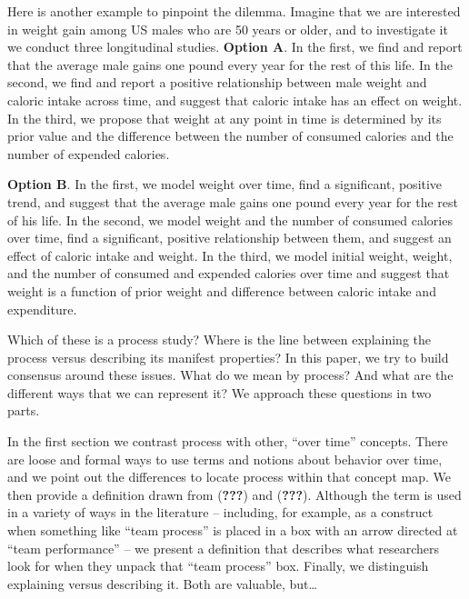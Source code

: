 \documentclass[english,,man]{apa6}
\theoremstyle{definition}
\theoremstyle{definition}
\theoremstyle{definition}
\theoremstyle{remark}
\begin{document}
Here is another example to pinpoint the dilemma. Imagine that we are
interested in weight gain among US males who are 50 years or older, and
to investigate it we conduct three longitudinal studies. \textbf{Option
A}. In the first, we find and report that the average male gains one
pound every year for the rest of this life. In the second, we find and
report a positive relationship between male weight and caloric intake
across time, and suggest that caloric intake has an effect on weight. In
the third, we propose that weight at any point in time is determined by
its prior value and the difference between the number of consumed
calories and the number of expended calories.

\textbf{Option B}. In the first, we model weight over time, find a
significant, positive trend, and suggest that the average male gains one
pound every year for the rest of his life. In the second, we model
weight and the number of consumed calories over time, find a
significant, positive relationship between them, and suggest an effect
of caloric intake and weight. In the third, we model initial weight,
weight, and the number of consumed and expended calories over time and
suggest that weight is a function of prior weight and difference between
caloric intake and expenditure.

Which of these is a process study? Where is the line between explaining
the process versus describing its manifest properties? In this paper, we
try to build consensus around these issues. What do we mean by process?
And what are the different ways that we can represent it? We approach
these questions in two parts.

In the first section we contrast process with other, \enquote{over time}
concepts. There are loose and formal ways to use terms and notions about
behavior over time, and we point out the differences to locate process
within that concept map. We then provide a definition drawn from
({\textbf{???}}) and ({\textbf{???}}). Although the term is used in a
variety of ways in the literature -- including, for example, as a
construct when something like \enquote{team process} is placed in a box
with an arrow directed at \enquote{team performance} -- we present a
definition that describes what researchers look for when they unpack
that \enquote{team process} box. Finally, we distinguish explaining
versus describing it. Both are valuable, but\ldots{}
\end{document}
